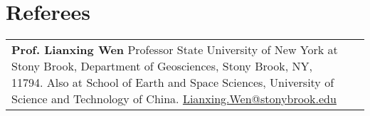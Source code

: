 \section*{Referees}

\begin{tabular}{@{} p{} p{}}
\textbf{Prof. Lianxing Wen}\newline
Professor \newline
State University of New York at Stony Brook, \newline
Department of Geosciences, Stony Brook, NY, 11794. \newline
Also at School of Earth and Space Sciences, \newline
University of Science and Technology of China. \newline
\href{mailto:Lianxing.Wen@stonybrook.edu}{Lianxing.Wen@stonybrook.edu}
&
~
\\
\end{tabular}
